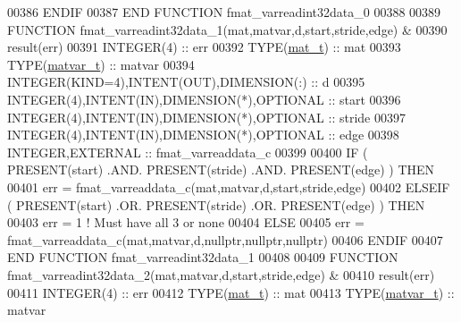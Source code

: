 \begin{DoxyCode}
00386 \textcolor{keywordflow}{    ENDIF}
00387 \textcolor{keyword}{END FUNCTION }fmat\_varreadint32data\_0
00388 
00389 \textcolor{keyword}{FUNCTION }fmat\_varreadint32data\_1(mat,matvar,d,start,stride,edge) &
00390                                                        result(err)
00391     \textcolor{keywordtype}{INTEGER(4)}                                  :: err
00392     \textcolor{keywordtype}{TYPE}(\hyperlink{group___m_a_t_gab0fc888f5a5d79943b16284b1f91c2e8}{mat\_t})                                 :: mat
00393     \textcolor{keywordtype}{TYPE}(\hyperlink{group___m_a_t_structmatvar__t}{matvar\_t})                              :: matvar
00394     \textcolor{keywordtype}{INTEGER(KIND=4)},\textcolor{keywordtype}{INTENT(OUT)},\textcolor{keywordtype}{DIMENSION(:)}    :: d
00395     \textcolor{keywordtype}{INTEGER(4)},\textcolor{keywordtype}{INTENT(IN)},\textcolor{keywordtype}{DIMENSION(*)},\textcolor{keywordtype}{OPTIONAL} :: start
00396     \textcolor{keywordtype}{INTEGER(4)},\textcolor{keywordtype}{INTENT(IN)},\textcolor{keywordtype}{DIMENSION(*)},\textcolor{keywordtype}{OPTIONAL} :: stride
00397     \textcolor{keywordtype}{INTEGER(4)},\textcolor{keywordtype}{INTENT(IN)},\textcolor{keywordtype}{DIMENSION(*)},\textcolor{keywordtype}{OPTIONAL} :: edge
00398     \textcolor{keywordtype}{INTEGER},\textcolor{keywordtype}{EXTERNAL}                            :: fmat\_varreaddata\_c
00399 
00400     \textcolor{keywordflow}{IF} ( \textcolor{keyword}{PRESENT}(start) .AND. \textcolor{keyword}{PRESENT}(stride) .AND. \textcolor{keyword}{PRESENT}(edge) ) \textcolor{keywordflow}{THEN}
00401         err = fmat\_varreaddata\_c(mat,matvar,d,start,stride,edge)
00402     \textcolor{keywordflow}{ELSEIF} ( \textcolor{keyword}{PRESENT}(start) .OR. \textcolor{keyword}{PRESENT}(stride) .OR. \textcolor{keyword}{PRESENT}(edge) ) \textcolor{keywordflow}{THEN}
00403         err = 1    \textcolor{comment}{! Must have all 3 or none}
00404     \textcolor{keywordflow}{ELSE}
00405         err = fmat\_varreaddata\_c(mat,matvar,d,nullptr,nullptr,nullptr)
00406 \textcolor{keywordflow}{    ENDIF}
00407 \textcolor{keyword}{END FUNCTION }fmat\_varreadint32data\_1
00408 
00409 \textcolor{keyword}{FUNCTION }fmat\_varreadint32data\_2(mat,matvar,d,start,stride,edge) &
00410                                                        result(err)
00411     \textcolor{keywordtype}{INTEGER(4)}                                  :: err
00412     \textcolor{keywordtype}{TYPE}(\hyperlink{group___m_a_t_gab0fc888f5a5d79943b16284b1f91c2e8}{mat\_t})                                 :: mat
00413     \textcolor{keywordtype}{TYPE}(\hyperlink{group___m_a_t_structmatvar__t}{matvar\_t})                              :: matvar

\end{DoxyCode}
